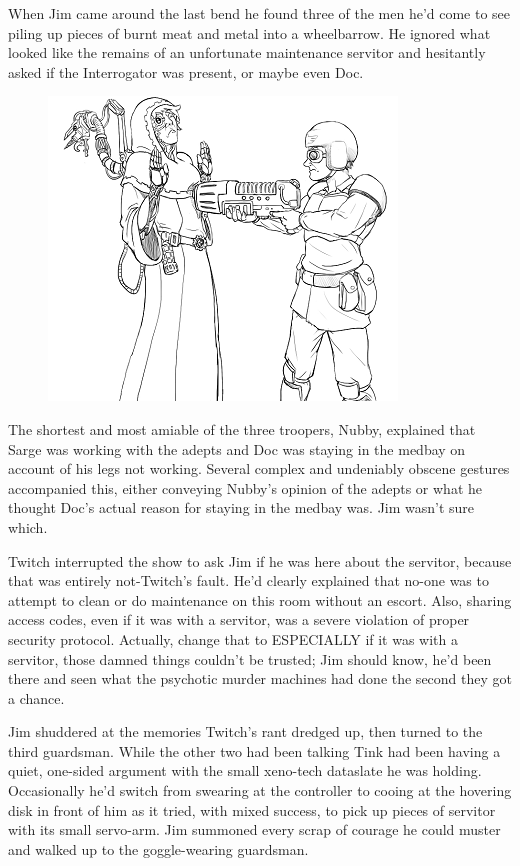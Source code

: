 When Jim came around the last bend he found three of the men he'd come to see piling up pieces of burnt meat and metal into a wheelbarrow. 
He ignored what looked like the remains of an unfortunate maintenance servitor and hesitantly asked if the Interrogator was present, or maybe even Doc.

\begin{figure}
	\begin{center}
		\includegraphics[width=\figwidth]{pics/11/2.png}
	\end{center}
\end{figure}
The shortest and most amiable of the three troopers, Nubby, explained that Sarge was working with the adepts and Doc was staying in the medbay on account of his legs not working. 
Several complex and undeniably obscene gestures accompanied this, either conveying Nubby's opinion of the adepts or what he thought Doc's actual reason for staying in the medbay was. 
Jim wasn't sure which.

Twitch interrupted the show to ask Jim if he was here about the servitor, because that was entirely not-Twitch's fault. 
He'd clearly explained that no-one was to attempt to clean or do maintenance on this room without an escort. 
Also, sharing access codes, even if it was with a servitor, was a severe violation of proper security protocol. 
Actually, change that to ESPECIALLY if it was with a servitor, those damned things couldn't be trusted; 
Jim should know, he'd been there and seen what the psychotic murder machines had done the second they got a chance.

Jim shuddered at the memories Twitch's rant dredged up, then turned to the third guardsman. 
While the other two had been talking Tink had been having a quiet, one-sided argument with the small xeno-tech dataslate he was holding. 
Occasionally he'd switch from swearing at the controller to cooing at the hovering disk in front of him as it tried, with mixed success, to pick up pieces of servitor with its small servo-arm. 
Jim summoned every scrap of courage he could muster and walked up to the goggle-wearing guardsman. 


